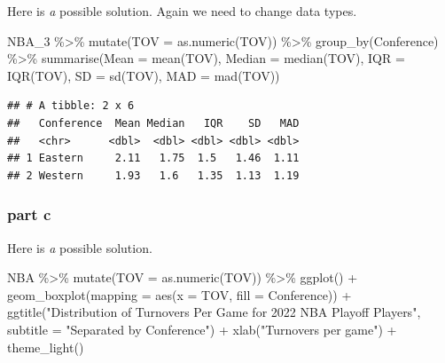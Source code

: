 \documentclass[
]{article}
\newenvironment{Shaded}{\begin{snugshade}}{\end{snugshade}}
\newcommand{\AttributeTok}[1]{\textcolor[rgb]{0.77,0.63,0.00}{#1}}
\newcommand{\FunctionTok}[1]{\textcolor[rgb]{0.00,0.00,0.00}{#1}}
\newcommand{\NormalTok}[1]{#1}
\newcommand{\SpecialCharTok}[1]{\textcolor[rgb]{0.00,0.00,0.00}{#1}}
\newcommand{\StringTok}[1]{\textcolor[rgb]{0.31,0.60,0.02}{#1}}
\begin{document}
Here is \emph{a} possible solution. Again we need to change data types.

\begin{Shaded}
\begin{Highlighting}[]
\NormalTok{NBA\_3 }\SpecialCharTok{\%\textgreater{}\%} \FunctionTok{mutate}\NormalTok{(}\AttributeTok{TOV =} \FunctionTok{as.numeric}\NormalTok{(TOV)) }\SpecialCharTok{\%\textgreater{}\%}  \FunctionTok{group\_by}\NormalTok{(Conference) }\SpecialCharTok{\%\textgreater{}\%} 
  \FunctionTok{summarise}\NormalTok{(}\AttributeTok{Mean =} \FunctionTok{mean}\NormalTok{(TOV), }\AttributeTok{Median =} \FunctionTok{median}\NormalTok{(TOV),}
            \AttributeTok{IQR =} \FunctionTok{IQR}\NormalTok{(TOV), }\AttributeTok{SD =} \FunctionTok{sd}\NormalTok{(TOV), }\AttributeTok{MAD =} \FunctionTok{mad}\NormalTok{(TOV))}
\end{Highlighting}
\end{Shaded}

\begin{verbatim}
## # A tibble: 2 x 6
##   Conference  Mean Median   IQR    SD   MAD
##   <chr>      <dbl>  <dbl> <dbl> <dbl> <dbl>
## 1 Eastern     2.11   1.75  1.5   1.46  1.11
## 2 Western     1.93   1.6   1.35  1.13  1.19
\end{verbatim}

\hypertarget{part-c}{%
\subsubsection{part c}\label{part-c}}

Here is \emph{a} possible solution.

\begin{Shaded}
\begin{Highlighting}[]
\NormalTok{NBA }\SpecialCharTok{\%\textgreater{}\%} \FunctionTok{mutate}\NormalTok{(}\AttributeTok{TOV =} \FunctionTok{as.numeric}\NormalTok{(TOV)) }\SpecialCharTok{\%\textgreater{}\%} 
  \FunctionTok{ggplot}\NormalTok{() }\SpecialCharTok{+} \FunctionTok{geom\_boxplot}\NormalTok{(}\AttributeTok{mapping =} \FunctionTok{aes}\NormalTok{(}\AttributeTok{x =}\NormalTok{ TOV, }\AttributeTok{fill =}\NormalTok{ Conference)) }\SpecialCharTok{+}
  \FunctionTok{ggtitle}\NormalTok{(}\StringTok{"Distribution of Turnovers Per Game for 2022 NBA Playoff Players"}\NormalTok{,}
          \AttributeTok{subtitle =} \StringTok{"Separated by Conference"}\NormalTok{) }\SpecialCharTok{+} \FunctionTok{xlab}\NormalTok{(}\StringTok{"Turnovers per game"}\NormalTok{) }\SpecialCharTok{+} \FunctionTok{theme\_light}\NormalTok{()}
\end{Highlighting}
\end{Shaded}
\end{document}
